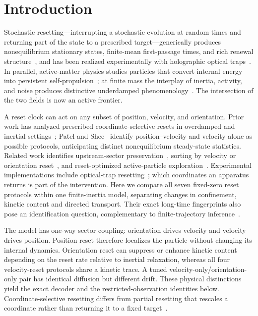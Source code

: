 \section{Introduction}\label{introduction}

Stochastic resetting---interrupting a stochastic evolution at random times and returning part of the state to a prescribed target---generically produces nonequilibrium stationary states, finite-mean first-passage times, and rich renewal structure~\cite{EvansMajumdar2011,EvansMajumdarSchehr2020}, and has been realized experimentally with holographic optical traps~\cite{TalFriedman2020,Besga2020}. In parallel, active-matter physics studies particles that convert internal energy into persistent self-propulsion~\cite{Romanczuk2012,Marchetti2013,Bechinger2016}; at finite mass the interplay of inertia, activity, and noise produces distinctive underdamped phenomenology~\cite{Lowen2020}. The intersection of the two fields is now an active frontier.

A reset clock can act on any subset of position, velocity, and orientation. Prior work has analyzed prescribed coordinate-selective resets in overdamped and inertial settings~\cite{KumarSadekarBasu,GhoshMandalChaki,Baouche,Shee,BaoucheKurzthaler2025,Gupta,Singh2020,CapalaDybiec2021,FrankeSokolov2026,OlsenLowen,Howlader2026,PatelShee}; Patel and Shee~\cite{PatelShee} identify position--velocity and velocity alone as possible protocols, anticipating distinct nonequilibrium steady-state statistics. Related work identifies upstream-sector preservation~\cite{ChakiOlsenLowen}, sorting by velocity or orientation reset~\cite{CleurenEichhorn2026}, and reset-optimized active-particle exploration~\cite{OlsenLowenCaprini2026}. Experimental implementations include optical-trap resetting~\cite{TalFriedman2020,Besga2020}; which coordinates an apparatus returns is part of the intervention. Here we compare all seven fixed-zero reset protocols within one finite-inertia model, separating changes in confinement, kinetic content and directed transport. Their exact long-time fingerprints also pose an identification question, complementary to finite-trajectory inference~\cite{FrishmanRonceray2020}.

The model has one-way sector coupling: orientation drives velocity and velocity drives position. Position reset therefore localizes the particle without changing its internal dynamics. Orientation reset can suppress or enhance kinetic content depending on the reset rate relative to inertial relaxation, whereas all four velocity-reset protocols share a kinetic trace. A tuned velocity-only/orientation-only pair has identical diffusion but different drift. These physical distinctions yield the exact decoder and the restricted-observation identities below. Coordinate-selective resetting differs from partial resetting that rescales a coordinate rather than returning it to a fixed target~\cite{TalFriedmanPartial2022}.

